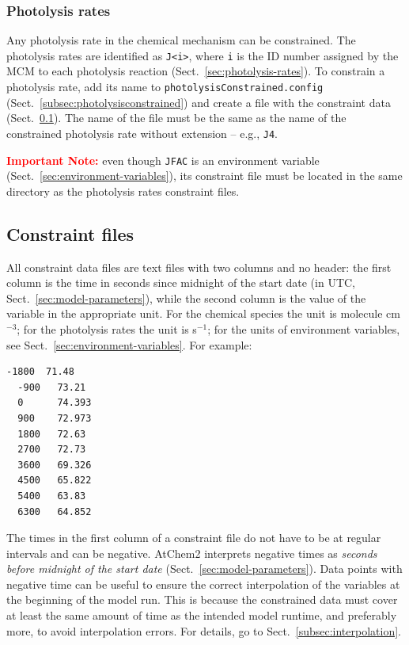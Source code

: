 \subsubsection{Photolysis rates}

Any photolysis rate in the chemical mechanism can be constrained. The photolysis rates are
identified as \texttt{J<i>}, where \texttt{i} is the ID number assigned by the MCM to each
photolysis reaction (Sect.~\ref{sec:photolysis-rates}). To constrain a photolysis rate, add its
name to \texttt{photolysisConstrained.config} (Sect.~\ref{subsec:photolysisconstrained}) and
create a file with the constraint data (Sect.~\ref{subsec:constraint-files}). The name of the
file must be the same as the name of the constrained photolysis rate without extension -- e.g.,
\texttt{J4}.

\medskip \noindent
\textcolor{red}{\bf Important Note:} even though \texttt{JFAC} is an environment variable
(Sect.~\ref{sec:environment-variables}), its constraint file must be located in the same
directory as the photolysis rates constraint files.

\subsection{Constraint files} \label{subsec:constraint-files}

All constraint data files are text files with two columns and no header: the first column is
the time in seconds since midnight of the start date (in UTC, Sect.~\ref{sec:model-parameters}),
while the second column is the value of the variable in the appropriate unit. For the chemical
species the unit is molecule cm$^{-3}$; for the photolysis rates the unit is s$^{-1}$; for the
units of environment variables, see Sect.~\ref{sec:environment-variables}. For example:

\begin{Verbatim}[fontsize=\small]
  -1800  71.48
  -900   73.21
  0      74.393
  900    72.973
  1800   72.63
  2700   72.73
  3600   69.326
  4500   65.822
  5400   63.83
  6300   64.852
\end{Verbatim}

The times in the first column of a constraint file do not have to be at regular intervals and
can be negative. AtChem2 interprets negative times as \emph{seconds before midnight of the
  start date} (Sect.~\ref{sec:model-parameters}). Data points with negative time can be useful
to ensure the correct interpolation of the variables at the beginning of the model run. This is
because the constrained data must cover at least the same amount of time as the intended model
runtime, and preferably more, to avoid interpolation errors. For details, go to
Sect.~\ref{subsec:interpolation}.

